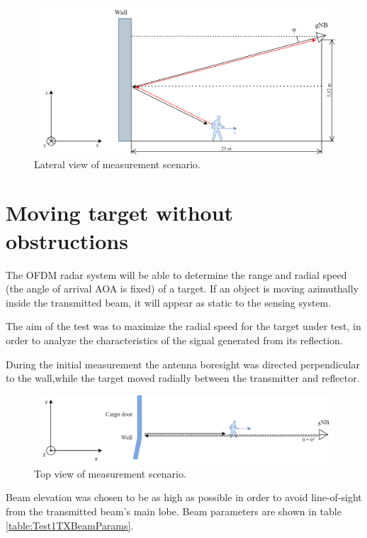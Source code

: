 \begin{figure}[H]
	\centering
	\includegraphics[width=1\textwidth]{Images/Test1/base-lateral_view}
	\caption{Lateral view of measurement scenario.}
	\label{fig:Test1_base-lateral_view}
\end{figure}

\section{Moving target without obstructions}

The OFDM radar system will be able to determine the range and radial speed (the angle of arrival AOA is fixed) of a target. If an object is moving azimuthally inside the transmitted beam, it will appear as static to the sensing system.

The aim of the test was to maximize the radial speed for the target under test, in order to analyze the characteristics of the signal generated from its reflection.

During the initial measurement the antenna boresight was directed perpendicular to the wall,while the target moved radially between the transmitter and reflector.

\begin{figure}[H]
	\centering
	\includegraphics[width=1\textwidth]{Images/Test1/base-top_view}
	\caption{Top view of measurement scenario.}
	\label{fig:Test1_base-top_view}
\end{figure}


Beam elevation was chosen to be as high as possible in order to avoid line-of-sight from the transmitted beam's main lobe. Beam parameters are shown in table \ref{table:Test1TXBeamParams}.


